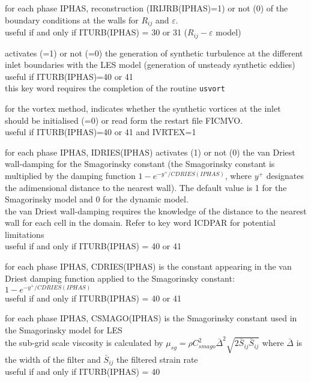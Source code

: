 {for each phase IPHAS, reconstruction (IRIJRB(IPHAS)=1) or not (0) of the
boundary conditions at the walls for $R_{ij}$ and  $\varepsilon$.\\
useful if and only if ITURB(IPHAS) = 30 or 31 ($R_{ij}-\varepsilon$ model)}



{activates (=1) or not (=0) the generation of synthetic turbulence at the
different inlet boundaries with the LES model (generation of unsteady synthetic
eddies)\\
useful if ITURB(IPHAS)=40 or 41\\
this key word requires the completion of the routine
\texttt{usvort}}

{for the vortex method, indicates whether the synthetic vortices at the inlet
should be initialised (=0) or read form the restart file FICMVO.\\ 
useful if ITURB(IPHAS)=40 or 41 and IVRTEX=1}


{for each phase IPHAS, IDRIES(IPHAS) activates (1) or not (0) the van
Driest wall-damping for the Smagorinsky constant (the Smagorinsky
constant is multiplied by the damping function
$1-e^{-y^+/CDRIES(IPHAS)}$, where $y^+$ designates the adimensional
distance to the nearest wall). The default value is 1 for the
Smagorinsky model and 0 for the dynamic model.\\
the van Driest wall-damping requires the knowledge of the distance to the
nearest wall for each cell in the domain. Refer to key word ICDPAR for potential
limitations\\
useful if and only if ITURB(IPHAS) = 40 or 41}

{for each phase IPHAS, CDRIES(IPHAS) is the constant appearing in the van Driest
damping function applied to the Smagorinsky constant: $1-e^{-y^+/CDRIES(IPHAS)}$\\ 
useful if and only if ITURB(IPHAS) = 40 or 41}

{for each phase IPHAS, CSMAGO(IPHAS) is the Smagorinsky constant used in
the Smagorinsky model for LES\\
the sub-grid scale viscosity is calculated by
 $\displaystyle\mu_{sg}=\rho C_{smago}^2\bar{\Delta}^2\sqrt{2\bar{S}_{ij}\bar{S}_{ij}}$
where $\bar{\Delta}$ is the width of the filter and $\bar{S}_{ij}$ the filtered
strain rate\\
useful if and only if ITURB(IPHAS) = 40}


